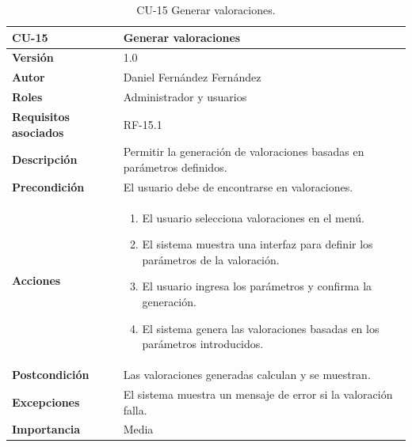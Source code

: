 \begin{table}[p]
        \centering
        \begin{tabularx}{\linewidth}{ p{} p{} }
            \toprule
            \textbf{CU-15} & \textbf{Generar valoraciones}\\
            \toprule
            \textbf{Versión} & 1.0 \\
            \textbf{Autor} & Daniel Fernández Fernández \\
            \textbf{Roles} & Administrador y usuarios \\
            \textbf{Requisitos asociados} & RF-15.1 \\
            \textbf{Descripción} & Permitir la generación de valoraciones basadas en parámetros definidos. \\
            \textbf{Precondición} & El usuario debe de encontrarse en valoraciones. \\
            \textbf{Acciones} &
            \begin{enumerate}
            \def\labelenumi{\arabic{enumi}.}
            \tightlist
            \item El usuario selecciona valoraciones en el menú.
            \item El sistema muestra una interfaz para definir los parámetros de la valoración.
            \item El usuario ingresa los parámetros y confirma la generación.
            \item El sistema genera las valoraciones basadas en los parámetros introducidos.
            \end{enumerate}\\
            \textbf{Postcondición} & Las valoraciones generadas calculan y se muestran. \\
            \textbf{Excepciones} & El sistema muestra un mensaje de error si la valoración falla. \\
            \textbf{Importancia} & Media \\
            \bottomrule
        \end{tabularx}
        \caption{CU-15 Generar valoraciones.}
\end{table}


